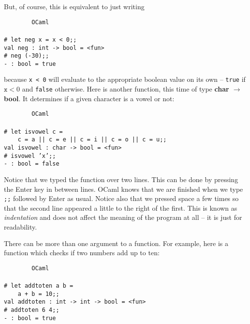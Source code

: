 \documentclass[]{book}
\newcommand\upquote[1]{\textquotesingle#1\textquotesingle}
\newcommand{\smspace}{\vspace{4mm}}
\begin{document}
\noindent But, of course, this is equivalent to just writing

\smspace
\noindent\verb!        OCaml!\\
\noindent\\
\noindent\verb!# let neg x = x < 0;;!\\
\noindent\verb!val neg : int -> bool = <fun>!\\
\noindent\texttt{\# neg (-30);;}\\
\noindent\verb!- : bool = true!
\smspace

\noindent because \texttt{x < 0} will evaluate to the appropriate boolean value on its own -- \texttt{true} if $\texttt{x} < 0$ and \texttt{false} otherwise. Here is another function, this time of type \textbf{\textsf{char $\rightarrow$ bool}}. It determines if a given character is a vowel or not:

\smspace
\noindent\verb!        OCaml!\\
\noindent\\
\noindent\verb!# let isvowel c =!\\
\noindent\mbox{\texttt{~~~~c = \upquote{a} || c = \upquote{e} || c = \upquote{i} || c = \upquote{o} || c = \upquote{u};;}}\\
\noindent\verb!val isvowel : char -> bool = <fun>!\\
\noindent\texttt{\# isvowel 'x';;}\\
\noindent\verb!- : bool = false!
\smspace

\noindent Notice that we typed the function over two lines. This can be done by pressing the Enter key in between lines. OCaml knows that we are finished when we type \texttt{;;} followed by Enter as usual. Notice also that we pressed space a few times so that the second line appeared a little to the right of the first. This is known as \textit{indentation} and does not affect the meaning of the program at all -- it is just for readability.

There can be more than one argument to a function. For example, here is a function which checks if two numbers add up to ten:

\smspace
\noindent\verb!        OCaml!\\
\noindent\\
\noindent\verb!# let addtoten a b =!\\
\noindent\verb!    a + b = 10;;!\\
\noindent\verb!val addtoten : int -> int -> bool = <fun>!\\
\noindent\texttt{\# addtoten 6 4;;}\\
\noindent\verb!- : bool = true!
\smspace
\end{document}
